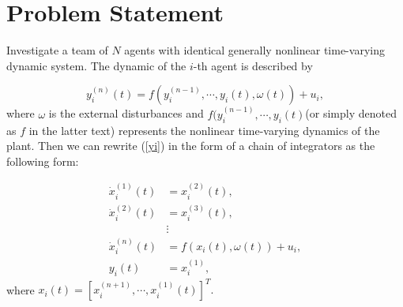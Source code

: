 \documentclass[english]{cccconf}
\newtheorem{lemma}{Lemma}
\begin{document}











\section{Problem Statement}

Investigate a team of $N$ agents with identical generally nonlinear time-varying dynamic system. The dynamic of the $i$-th agent is described by

\begin{equation}
  \label{yi}
  y_i^{(n)}(t) = f(y_i^{(n-1)},\cdots,y_i(t),\omega(t))+u_i,
\end{equation}where $\omega$ is the external disturbances and $f(y_i^{(n-1)},\cdots, y_i(t)$(or simply denoted as $f$ in the latter text) represents the nonlinear time-varying dynamics of the plant. Then we can rewrite (\ref{yi}) in the form of a chain of integrators as the following form:



\begin{equation}
  \label{ss1}
  \begin{aligned}
  \dot x_i^{(1)}(t) &= x_i^{(2)}(t),\\
  \dot x_i^{(2)}(t) &= x_i^{(3)}(t),\\
  & \vdots \\
  \dot x_i^{(n)}(t) &= f(x_i(t),\omega(t))+u_i,\\
  y_i(t) &= x_i^{(1)},
  \end{aligned}
\end{equation}where $x_i(t) = [x_i^{(n+1)},\cdots, x_i^{(1)}(t)]^T.$
\end{document}
